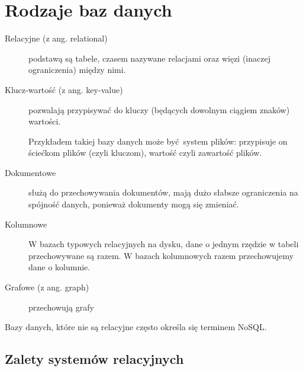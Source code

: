 \documentclass[a4paper]{article}
\begin{document}
\section{Rodzaje baz danych%
  \label{rodzaje-baz-danych}%
}
%
\begin{description}
\item[{Relacyjne (z ang. relational)}] \leavevmode 
podstawą są tabele, czasem nazywane relacjami oraz więzi
(inaczej ograniczenia) między nimi.

\item[{Klucz-wartość (z ang. key-value)}] \leavevmode 
pozwalają przypisywać do kluczy (będących dowolnym ciągiem znaków) wartości.

Przykładem takiej bazy danych może być~system plików:
przypisuje on ściećkom plików (czyli kluczom), wartość czyli zawartość
plików.

\item[{Dokumentowe}] \leavevmode 
służą do przechowywania dokumentów, mają dużo
słabsze ograniczenia na spójność danych, ponieważ dokumenty
mogą się zmieniać.

\item[{Kolumnowe}] \leavevmode 
W bazach typowych relacyjnych na dysku, dane o jednym
rzędzie w tabeli przechowywane są razem. W bazach kolumnowych
razem przechowujemy dane o kolumnie.

\item[{Grafowe (z ang. graph)}] \leavevmode 
przechowują grafy

\end{description}

Bazy danych, które nie są relacyjne często określa się terminem
NoSQL.


\subsection{Zalety systemów relacyjnych%
  \label{zalety-systemow-relacyjnych}%
}
\end{document}
